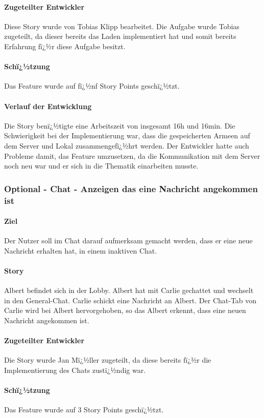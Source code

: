 \documentclass[12pt, titlepage]{scrartcl}
\begin{document}
			\paragraph{Zugeteilter Entwickler} Diese Story wurde von Tobias Klipp bearbeitet. Die Aufgabe wurde Tobias zugeteilt, da dieser bereits das Laden implementiert hat und somit bereits Erfahrung fï¿½r diese Aufgabe besitzt.
			\paragraph{Schï¿½tzung}
			Das Feature wurde auf fï¿½nf Story Points geschï¿½tzt.
			\paragraph{Verlauf der Entwicklung} 
			Die Story benï¿½tigte eine Arbeitszeit von insgesamt 16h und 16min. Die Schwierigkeit bei der Implementierung war, dass die gespeicherten Armeen auf dem Server und Lokal zusammengefï¿½hrt werden. Der Entwickler hatte auch Probleme damit, das Feature umzusetzen, da die Kommunikation mit dem Server noch neu war und er sich in die Thematik einarbeiten musste.
			\subsubsection{Optional - Chat - Anzeigen das eine Nachricht angekommen ist}
			\paragraph{Ziel} Der Nutzer soll im Chat darauf aufmerksam gemacht werden, dass er eine neue Nachricht erhalten hat, in einem inaktiven Chat.
			\paragraph{Story}Albert befindet sich in der Lobby. Albert hat mit Carlie gechattet und wechselt in den General-Chat. Carlie schickt eine Nachricht an Albert. Der Chat-Tab von Carlie wird bei Albert hervorgehoben, so das Albert erkennt, dass eine neuen Nachricht angekommen ist.
			\paragraph{Zugeteilter Entwickler} Die Story wurde Jan Mï¿½ller zugeteilt, da diese bereits fï¿½r die Implementierung des Chats zustï¿½ndig war. 
			\paragraph{Schï¿½tzung}
			Das Feature wurde auf 3 Story Points geschï¿½tzt.
\end{document}
